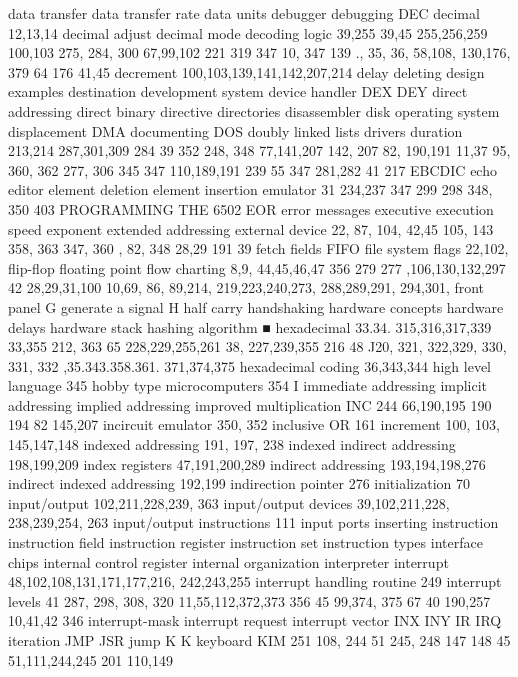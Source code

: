 \documentclass{book}
\begin{document}
{{{{{{{{{{{{{{{{{{{{{{{{{{{{{{{{{{{{{{{{{{{{{{{{{{{{{{{{{{{{{{{{{{{{{{{{{{{{{{{{{{{{{{{{{{{{{{{{{{{{{{{{{{{{{{{{{{{{{{{{{{{{{{{{{{{{{{{{{{{{data transfer
data transfer rate
data units
debugger
debugging
DEC
decimal 12,13,14
decimal adjust
decimal mode
decoding logic
39,255
39,45
255,256,259
100,103
275, 284, 300
67,99,102
221
319
347
10, 347
139
., 35, 36, 58,108,
130,176, 379
64
176
41,45
decrement 100,103,139,141,142,207,214
delay
deleting
design examples
destination
development system
device handler
DEX
DEY
direct addressing
direct binary
directive
directories
disassembler
disk operating system
displacement
DMA
documenting
DOS
doubly linked lists
drivers
duration
213,214
287,301,309
284
39
352
248, 348
77,141,207
142, 207
82, 190,191
11,37
95, 360, 362
277, 306
345
347
110,189,191
239
55
347
281,282
41
217
EBCDIC
echo
editor
element deletion
element insertion
emulator
31
234,237
347
299
298
348, 350
403
PROGRAMMING THE 6502
EOR
error messages
executive
execution speed
exponent
extended addressing
external device
22, 87, 104,
42,45
105, 143
358, 363
347, 360
, 82, 348
28,29
191
39
fetch
fields
FIFO
file system
flags 22,102,
flip-flop
floating point
flow charting 8,9,
44,45,46,47
356
279
277
,106,130,132,297
42
28,29,31,100
10,69, 86, 89,214,
219,223,240,273, 288,289,291,
294,301,
front panel
G
generate a signal
H
half carry
handshaking
hardware concepts
hardware delays
hardware stack
hashing algorithm ■
hexadecimal 33.34.
315,316,317,339
33,355
212, 363
65
228,229,255,261
38, 227,239,355
216
48
J20, 321, 322,329,
330, 331, 332
,35.343.358.361.
371,374,375
hexadecimal coding 36,343,344
high level language 345
hobby type microcomputers 354
I
immediate addressing
implicit addressing
implied addressing
improved multiplication
INC
244
66,190,195
190
194
82
145,207
incircuit emulator 350, 352
inclusive OR 161
increment 100, 103, 145,147,148
indexed addressing 191, 197, 238
indexed indirect addressing 198,199,209
index registers 47,191,200,289
indirect addressing 193,194,198,276
indirect indexed addressing 192,199
indirection pointer 276
initialization 70
input/output 102,211,228,239, 363
input/output devices 39,102,211,228,
238,239,254, 263
input/output instructions 111
input ports
inserting
instruction
instruction field
instruction register
instruction set
instruction types
interface chips
internal control register
internal organization
interpreter
interrupt 48,102,108,131,171,177,216,
242,243,255
interrupt handling routine 249
interrupt levels
41
287, 298, 308, 320
11,55,112,372,373
356
45
99,374, 375
67
40
190,257
10,41,42
346
interrupt-mask
interrupt request
interrupt vector
INX
INY
IR
IRQ
iteration
JMP
JSR
jump
K
K
keyboard
KIM
251
108, 244
51
245, 248
147
148
45
51,111,244,245
201
110,149
}}}}}}}}}}}}}}}}}}}}}}}}}}}}}}}}}}}}}}}}}}}}}}}}}}}}}}}}}}}}}}}}}}}}}}}}}}}}}}}}}}}}}}}}}}}}}}}}}}}}}}}}}}}}}}}}}}}}}}}}}}}}}}}}}}}}}}}}}}}}
\end{document}
